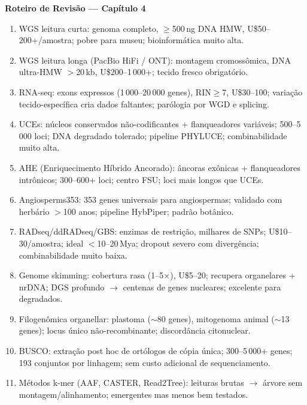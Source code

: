 \clearpage
\begin{destaque}
\textbf{Roteiro de Revisão --- Capítulo 4}
\begin{enumerate}
    \item WGS leitura curta: genoma completo, $\geq$500\,ng DNA HMW, U\$50--200+/amostra; pobre para museu; bioinformática muito alta.
    \item WGS leitura longa (PacBio HiFi / ONT): montagem cromossômica, DNA ultra-HMW $>$20\,kb, U\$200--1\,000+; tecido fresco obrigatório.
    \item RNA-seq: exons expressos (1\,000--20\,000 genes), RIN$\geq$7, U\$30--100; variação tecido-específica cria dados faltantes; parólogia por WGD e splicing.
    \item UCEs: núcleos conservados não-codificantes + flanqueadores variáveis; 500--5\,000 loci; DNA degradado tolerado; pipeline PHYLUCE; combinabilidade muito alta.
    \item AHE (Enriquecimento Híbrido Ancorado): âncoras exônicas + flanqueadores intrônicos; 300--600+ loci; centro FSU; loci mais longos que UCEs.
    \item Angiosperms353: 353 genes universais para angiospermas; validado com herbário $>$100 anos; pipeline HybPiper; padrão botânico.
    \item RADseq/ddRADseq/GBS: enzimas de restrição, milhares de SNPs; U\$10--30/amostra; ideal $<$10--20\,Mya; dropout severo com divergência; combinabilidade muito baixa.
    \item Genome skimming: cobertura rasa (1--5$\times$), U\$5--20; recupera organelares + nrDNA; DGS profundo $\to$ centenas de genes nucleares; excelente para degradados.
    \item Filogenômica organellar: plastoma ($\sim$80 genes), mitogenoma animal ($\sim$13 genes); locus único não-recombinante; discordância citonuclear.
    \item BUSCO: extração post hoc de ortólogos de cópia única; 300--5\,000+ genes; 193 conjuntos por linhagem; sem custo adicional de sequenciamento.
    \item Métodos k-mer (AAF, CASTER, Read2Tree): leituras brutas $\to$ árvore sem montagem/alinhamento; emergentes mas menos bem testados.
\end{enumerate}
\end{destaque}

\clearpage

\printbibliography[heading=subbibliography,title={Referências}]

